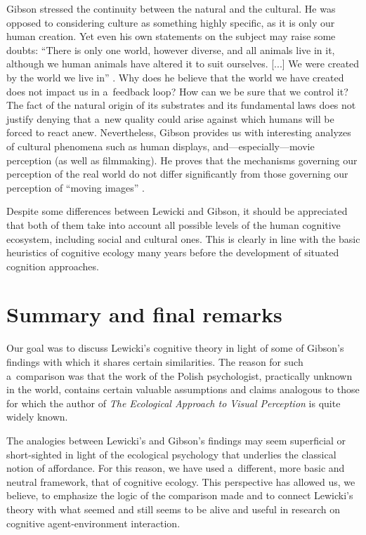 \documentclass[%
manuscript=article,
year=2024,
volume=77,
doi=10.59203/zfn.77.693,
]{zfn}
\begin{document}
Gibson stressed the continuity between the natural and the cultural. He was opposed to considering culture as something highly specific, as it is only our human creation. Yet even his own statements on the subject may raise some doubts: ``There is only one world, however diverse, and all animals live in it, although we human animals have altered it to suit ourselves. [...] We were created by the world we live in'' 
\parencite[][p.130]{gibson_ecological_1979}. %
 Why does he believe that the world we have created does not impact us in a~feedback loop? How can we be sure that we control it? The fact of the natural origin of its substrates and its fundamental laws does not justify denying that a~new quality could arise against which humans will be forced to react anew. Nevertheless, Gibson provides us with interesting analyzes of cultural phenomena such as human displays, and---especially---movie perception (as well as filmmaking). He proves that the mechanisms governing our perception of the real world do not differ significantly from those governing our perception of ``moving images'' 
\parencites[][]{gibson_senses_1966}[][]{gibson_ecological_1979}.%




Despite some differences between Lewicki and Gibson, it should be appreciated that both of them take into account all possible levels of the human cognitive ecosystem, including social and cultural ones. This is clearly in line with the basic heuristics of cognitive ecology many years before the development of situated cognition approaches.



\section{Summary and final remarks}

Our goal was to discuss Lewicki's cognitive theory in light of some of Gibson's findings with which it shares certain similarities. The reason for such a~comparison was that the work of the Polish psychologist, practically unknown in the world, contains certain valuable assumptions and claims analogous to those for which the author of \textit{The Ecological Approach to Visual Perception} is quite widely known.



The analogies between Lewicki's and Gibson's findings may seem superficial or short-sighted in light of the ecological psychology that underlies the classical notion of affordance. For this reason, we have used a~different, more basic and neutral framework, that of cognitive ecology. This perspective has allowed us, we believe, to emphasize the logic of the comparison made and to connect Lewicki's theory with what seemed and still seems to be alive and useful in research on cognitive agent-environment interaction.
\end{document}
